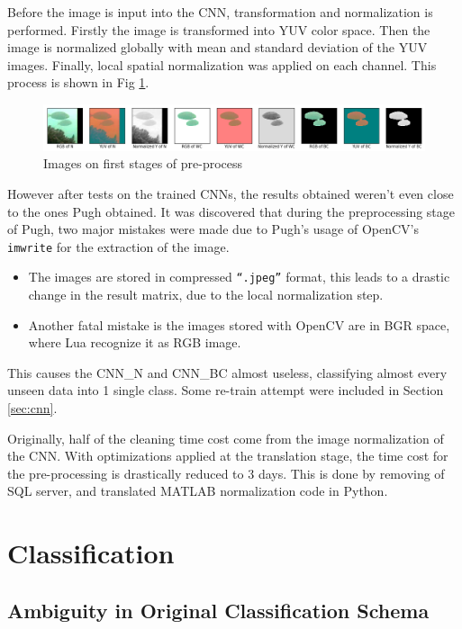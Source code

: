 \documentclass[bsc,logo,twoside,fullspacing,parskip]{infthesis}
\begin{document}
Before the image is input into the CNN, transformation and normalization is performed. 
Firstly the image is transformed into YUV color space.
Then the image is normalized globally with mean and standard deviation of the YUV images.
Finally, local spatial normalization was applied on each channel.
This process is shown in Fig \ref{fig:imageprepro}.

\begin{figure}[ht]
\centering
    \includegraphics[scale=0.4]{graph/imagepre.png}
    \caption{Images on first stages of pre-process}
    \label{fig:imageprepro}
\end{figure}

However after tests on the trained CNNs, the results obtained weren't even close to the ones Pugh obtained.
It was discovered that during the preprocessing stage of Pugh, two major mistakes were made due to Pugh's usage of OpenCV's {\tt imwrite} for the extraction of the image.

\begin{itemize}
\setlength{\parskip}{1pt}
\item
The images are stored in compressed {\tt ``.jpeg''} format, this leads to a drastic change in the result matrix, due to the local normalization step. 
\item
Another fatal mistake is the images stored with OpenCV are in BGR space, where Lua recognize it as RGB image.
\end{itemize}
This causes the CNN\_N and CNN\_BC almost useless, classifying almost every unseen data into 1 single class. Some re-train attempt were included in Section \ref{sec:cnn}.

Originally, half of the cleaning time cost come from the image normalization of the CNN.
With optimizations applied at the translation stage, the time cost for the pre-processing is drastically reduced to 3 days. 
This is done by removing of SQL server, and translated MATLAB normalization code in Python.



\chapter{Classification}
\label{chap:classify}

\section{Ambiguity in Original Classification Schema}
\label{sec:AmbigCS}
\end{document}

